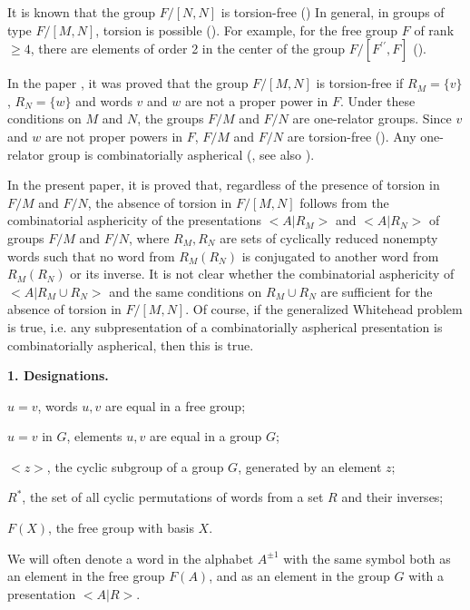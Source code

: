 \documentclass[12pt,reqno]{amsart}
\begin{document}
It is known that the group $F/[N,N]$ is torsion-free (\cite{higman})
In general, in groups of type $F/[M, N]$, torsion is possible (\cite{ch_gupta, kuzmin1, kuzmin2}).
For example, for the free group $F$ of rank $\geq 4$, there are elements of order 2 in the center of the group $F/[F^{\prime\prime}, F]$ (\cite{ch_gupta}).


In the paper \cite{kuzmin2}, it was proved that the group $F/[M,N]$ is torsion-free if  $R_M=\{v\}$, $R_N=\{w\}$ and words $v$ and $w$ are not a proper power in $F$. Under these conditions on $M$ and $N$, the groups $F/M$ and $F/N$ are one-relator groups. Since $v$ and $w$ are not proper powers in $F$, $F/M$ and $F/N$ are torsion-free (\cite{Karrass_Magnus_Solitar}). Any one-relator group is combinatorially aspherical (\cite{lind_pioneer}, see also \cite{lind,chiswell}). %

In the present paper, it is proved that, regardless of the presence of torsion in $F/M$ and $F/N$, the absence of torsion in $F/[M,N]$ follows from the combinatorial asphericity of the presentations $<A|R_M>$ and $<A|R_N>$ of groups $F/M$ and $F/N$,
 where
 $R_M, R_N$ are sets of cyclically reduced nonempty words such that no word from $R_M (R_N)$ is conjugated to another word from $R_M (R_N)$ or its inverse.
  It is not clear whether the combinatorial asphericity of $<A|R_M\cup R_N>$ and the same conditions on $R_M\cup R_N$ are sufficient for the absence of torsion in $F/[M,N]$. Of course, if the generalized Whitehead problem is true, i.e. any subpresentation of a combinatorially aspherical presentation is combinatorially aspherical, then this is true.
 


\vspace{3mm}
{\bf 1. Designations.}

$u=v$, words $u,v$ are equal in a free group;

$u=v$ in $G$, elements $u,v$ are equal in a group $G$;


$<z>$, the cyclic subgroup of a group $G$, generated by an element $z$;

$R^*$, the set of all cyclic permutations of words from a set $R$ and their inverses;

$F(X)$, the free group with basis $X$.

We will often denote a word in the alphabet $A^{\pm 1}$ with the same symbol both as an element in the free group $F(A)$, and as an element in the group $G$ with a presentation $<A|R>$.
\end{document}
